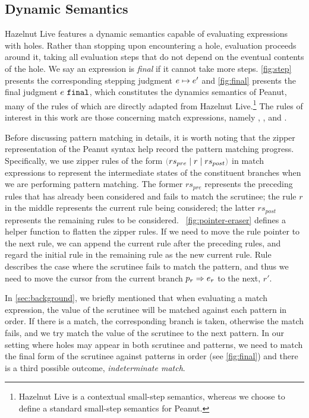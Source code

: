 \subsection{Dynamic Semantics}\label{sec:dynamics}




Hazelnut Live \cite{DBLP:journals/pacmpl/OmarVCH19} features a dynamic semantics capable of evaluating expressions with holes.
Rather than stopping upon encountering a hole, evaluation proceeds around it, taking all evaluation steps that do not depend on the eventual contents of the hole. We say an expression is \textit{final} if it cannot take more steps.
\autoref{fig:step} presents the corresponding stepping judgment $e \mapsto e'$ and \autoref{fig:final} presents the final judgment $e ~\mathtt{final}$, which constitutes the dynamics semantics of Peanut, many of the rules of which are directly adapted from Hazelnut Live.\footnote{Hazelnut Live is a contextual small-step semantics, whereas we choose to define a standard small-step semantics for Peanut.}
The rules of interest in this work are those concerning match expressions, namely \ITSuccMatch, \ITFailMatch, and \IMatch.

Before discussing pattern matching in details, it is worth noting that the zipper representation of the Peanut syntax help record the pattern matching progress.
Specifically, we use zipper rules of the form $\zrulsP{rs_{pre}}{r}{rs_{post}}$ in match expressions to represent the intermediate states of the constituent branches when we are performing pattern matching.
The former $rs_{pre}$ represents the preceding rules that has already been considered and fails to match the scrutinee; the rule $r$ in the middle represents the current rule being considered; the latter $rs_{post}$ represents the remaining rules to be considered.
\figurename~\ref{fig:pointer-eraser} defines a helper function to flatten the zipper rules.
If we need to move the rule pointer to the next rule, we can append the current rule after the preceding rules, and regard the initial rule in the remaining rule as the new current rule.
Rule \ITFailMatch describes the case where the scrutinee fails to match the pattern, and thus we need to move the cursor from the current branch $p_r \Rightarrow e_r$ to the next, $r'$.

In \autoref{sec:background}, we briefly mentioned that when evaluating a match expression, the value of the scrutinee will be matched against each pattern in order. If there is a match, the corresponding branch is taken, otherwise the match fails, and we try match the value of the scrutinee to the next pattern. In our setting where holes may appear in both scrutinee and patterns, we need to match the final form of the scrutinee against patterns in order (see \autoref{fig:final}) and there is a third possible outcome, \textit{indeterminate match}.

